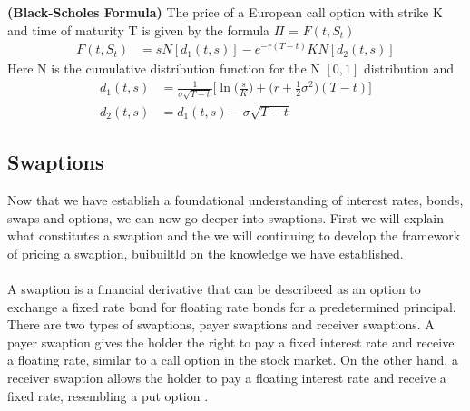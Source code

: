 \begin{proposition}
    \textbf{(Black-Scholes Formula)} The price of a European call option with strike K and time of maturity T 
    is given by the formula $\Pi$ = $F(t,S_t)$
    \begin{align*}
        F(t,S_t) & =s N[d_1(t,s)] -e^{-r(T-t)}KN[d_2(t,s)] 
    \end{align*}
    Here N is the cumulative distribution function for the N $[0,1]$ distribution and 
    \begin{align*}
        d_1(t,s) &= \frac{1}{\sigma \sqrt{T-t}} \Big[ \ln \Big(\frac{s}{K} \Big) +  \Big(r + \frac{1}{2} \sigma^2)(T-t)  \Big] \\
        d_2(t,s) &= d_1(t,s)-\sigma \sqrt{T-t}
    \end{align*}
    \cite{Bjork}
\end{proposition}
\subsection{Swaptions}
Now that we have establish a foundational understanding of interest rates, bonds, swaps and options, we can
now go deeper into swaptions. First we will explain what constitutes a swaption and the we will continuing 
to develop the framework of pricing a swaption, buibuiltld on the knowledge we have established.  
\\\\
A swaption is a financial derivative that can be describeed as an option to exchange a fixed rate bond for
floating rate bonds for a predetermined principal. 
There are two types of swaptions, payer swaptions and receiver swaptions.
A payer swaption gives the holder the right to pay a fixed interest rate and receive a floating rate, 
similar to a call option in the stock market. On the other hand, a receiver swaption allows the holder
to pay a floating interest rate and receive a fixed rate, resembling a put option \cite{Lindstrom} .

